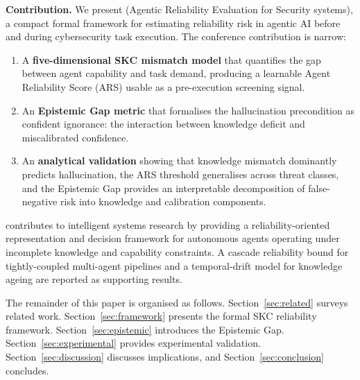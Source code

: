 \textbf{Contribution.}
We present \ARES{} (Agentic Reliability Evaluation for Security systems),
a compact formal framework for estimating reliability risk in agentic AI
before and during cybersecurity task execution. The conference contribution
is narrow:
\begin{enumerate}[noitemsep, leftmargin=*]
  \item A \textbf{five-dimensional SKC mismatch model} that quantifies the
    gap between agent capability and task demand, producing a learnable
    Agent Reliability Score (ARS) usable as a pre-execution screening
    signal.
  \item An \textbf{Epistemic Gap metric} that formalises the hallucination
    precondition as confident ignorance: the interaction between knowledge
    deficit and miscalibrated confidence.
  \item An \textbf{analytical validation} showing that knowledge
    mismatch dominantly predicts hallucination, the ARS threshold
    generalises across threat classes, and the Epistemic Gap provides an
    interpretable decomposition of false-negative risk into knowledge
    and calibration components.
\end{enumerate}
\ARES{} contributes to intelligent systems research by providing a
reliability-oriented representation and decision framework for autonomous
agents operating under incomplete knowledge and capability constraints.
A cascade reliability bound for tightly-coupled multi-agent pipelines and
a temporal-drift model for knowledge ageing are reported as supporting
results.

The remainder of this paper is organised as follows. Section~\ref{sec:related}
surveys related work. Section~\ref{sec:framework} presents the formal SKC
reliability framework. Section~\ref{sec:epistemic} introduces the Epistemic
Gap. Section~\ref{sec:experimental} provides experimental validation.
Section~\ref{sec:discussion} discusses implications, and
Section~\ref{sec:conclusion} concludes.
